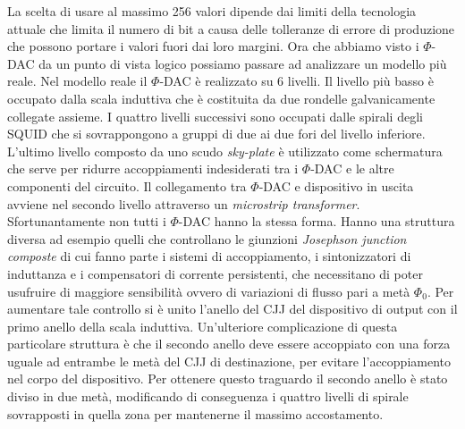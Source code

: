 La scelta di usare al massimo 256 valori dipende dai limiti della tecnologia attuale che limita il numero di bit a causa delle tolleranze di errore di produzione che possono portare i valori fuori dai loro margini.
\cite{ACI}Ora che abbiamo visto i $\Phi$-DAC da un punto di vista logico possiamo passare ad analizzare un modello più reale. Nel modello reale il $\Phi$-DAC è realizzato su 6 livelli. Il livello più basso è occupato dalla scala induttiva che è costituita da due rondelle galvanicamente collegate assieme. I quattro livelli successivi sono occupati dalle spirali degli SQUID che si sovrappongono a gruppi di due ai due fori del livello inferiore. L'ultimo livello composto da uno scudo \textit{sky-plate} è utilizzato come schermatura che serve per ridurre accoppiamenti indesiderati tra i $\Phi$-DAC e le altre componenti del circuito. Il collegamento tra $\Phi$-DAC e dispositivo in uscita avviene nel secondo livello attraverso un \textit{microstrip transformer}. Sfortunantamente non tutti i $\Phi$-DAC hanno la stessa forma. Hanno una struttura diversa ad esempio quelli che controllano le giunzioni \textit{Josephson junction composte}  di cui fanno parte i sistemi di accoppiamento, i sintonizzatori di induttanza e i compensatori di corrente persistenti, che necessitano di poter usufruire di maggiore sensibilità ovvero di variazioni di flusso pari a metà $\Phi_0$. Per aumentare tale controllo si è unito l'anello del CJJ del dispositivo di output con il primo anello della scala induttiva. Un'ulteriore complicazione di questa particolare struttura è che il secondo anello deve essere accoppiato con una forza uguale ad entrambe le metà del CJJ di destinazione, per evitare l'accoppiamento nel corpo del dispositivo. Per ottenere questo traguardo il secondo anello è stato diviso in due metà, modificando di conseguenza i quattro livelli di spirale sovrapposti in quella zona per mantenerne il massimo accostamento.

